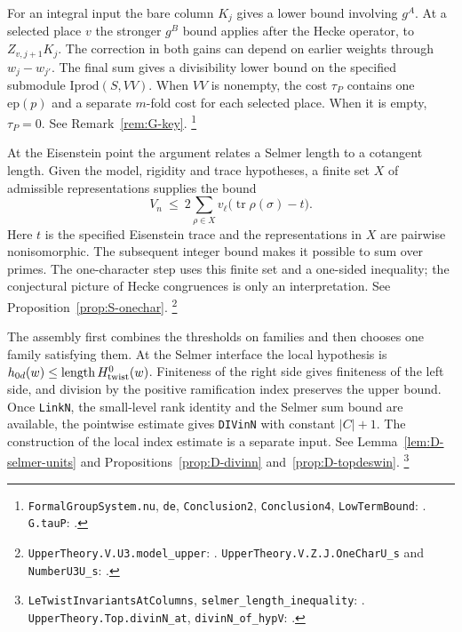 \begin{description}[leftmargin=0pt,style=nextline]
\item[G. Where does the stronger local gain occur?]
For an integral input the bare column $K_j$ gives a lower bound involving $g^A$.
At a selected place $v$ the stronger $g^B$ bound applies after the Hecke operator,
to $Z_{v,j+1}K_j$. The correction in both gains can depend on earlier weights through
$w_j-w_{j'}$. The final sum gives a divisibility lower bound on the specified submodule
$\mathrm{Iprod}(S,VV)$. When $VV$ is nonempty, the cost $\tau_P$ contains one
$\mathrm{ep}(p)$ and a separate $m$-fold cost for each selected place. When it is empty,
$\tau_P=0$. See Remark~\ref{rem:G-key}.
\footnote{\texttt{FormalGroupSystem.nu}, \texttt{de}, \texttt{Conclusion2},
\texttt{Conclusion4}, \texttt{LowTermBound}: .
\texttt{G.tauP}: .}

\item[S. How do deformation points bound a Selmer length?]
At the Eisenstein point the argument relates a Selmer length to a cotangent length. Given
the model, rigidity and trace hypotheses, a finite set $X$ of admissible representations
supplies the bound
\[
  V_n \ \le\ 2\sum_{\rho\in X}v_\ell\bigl(\operatorname{tr}\rho(\sigma)-t\bigr).
\]
Here $t$ is the specified Eisenstein trace and the representations in $X$ are pairwise
nonisomorphic. The subsequent integer bound makes it possible to sum over primes. The
one-character step uses this finite set and a one-sided inequality; the conjectural picture
of Hecke congruences is only an interpretation. See Proposition~\ref{prop:S-onechar}.
\footnote{\texttt{UpperTheory.V.U3.model\_upper}: .
\texttt{UpperTheory.V.Z.J.OneCharU\_s} and \texttt{NumberU3U\_s}:
.}

\item[D. How do the inputs reach the lattice chain?]
The assembly first combines the thresholds on families and then chooses one family satisfying
them. At the Selmer interface the local hypothesis is
$h_{0d}(w)\leq\operatorname{length} H^0_{\rm twist}(w)$. Finiteness of the right side
gives finiteness of the left side, and division by the positive ramification index preserves
the upper bound. Once \texttt{LinkN}, the small-level rank identity and the Selmer sum bound
are available, the pointwise estimate gives \texttt{DIVinN} with constant $|C|+1$.
The construction of the local index estimate is a separate input. See
Lemma~\ref{lem:D-selmer-units} and Propositions~\ref{prop:D-divinn} and~\ref{prop:D-topdeswin}.
\footnote{\texttt{LeTwistInvariantsAtColumns}, \texttt{selmer\_length\_inequality}:
.
\texttt{UpperTheory.Top.divinN\_at}, \texttt{divinN\_of\_hypV}:
.}
\end{description}

